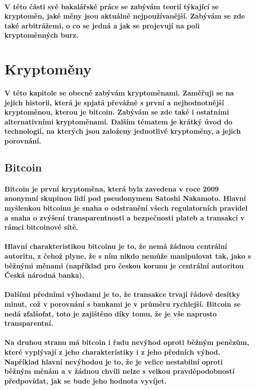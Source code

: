 \documentclass[thesis=B,czech]{FITthesis}[2019/03/21]
\begin{document}
\paragraph{
V této části své bakalářské práce se zabývám teorií týkající se kryptoměn, jaké měny jsou aktuálně nejpoužívanější. Zabývám se zde také arbitrážemi, o co se jedná a jak se projevují na poli kryptoměnných burz.
}
\section{Kryptoměny}
\paragraph{
V této kapitole se obecně zabývám kryptoměnami. Zaměřuji se na jejich historii, která je spjatá převážně s první a nejhodnotnější kryptoměnou, kterou je bitcoin. Zabývám se zde také i ostatními alternativními kryptoměnami. 
Dalším tématem je krátký úvod do technologií, na kterých jsou založeny jednotlivé kryptoměny, a jejich porovnání. \cite{BudoucnostFinTrhu}
}
\subsection{Bitcoin}
\paragraph{
Bitcoin je první kryptoměna, která byla zavedena v roce 2009 anonymní skupinou lidí pod pseudonymem Satoshi Nakamoto. Hlavní myšlenkou bitcoinu je snaha o odstranění všech regulatorních pravidel a snaha o zvýšení transparentnosti a bezpečnosti plateb a transakcí v rámci bitcoinové sítě. \cite{Finex}
}
\paragraph{
Hlavní charakteristikou bitcoinu je to, že nemá žádnou centrální autoritu, z čehož plyne, že s ním nikdo nemůže manipulovat tak, jako s běžnými měnami (například pro českou korunu je centrální autoritou Česká národná banka).
}
\paragraph{
Dalšími předními výhodami je to, že transakce trvají řádově desítky minut, což v porovnání s bankami je v průměru rychlejší. Bitcoin se nedá zfalšofat, toto je zajištěno díky tomu, že je vše naprosto transparentní. 
}
\paragraph{
Na druhou stranu má bitcoin i řadu nevýhod oproti běžným penězům, které vyplývají z jeho charakteristiky i z jeho předních výhod. Například hlavní nevýhodou je to, že je velice nestabilní oproti běžným měnám a v žádnou chvíli nelze s velkou pravděpodobností předpovídat, jak se bude jeho hodnota vyvíjet. 
}
\end{document}
